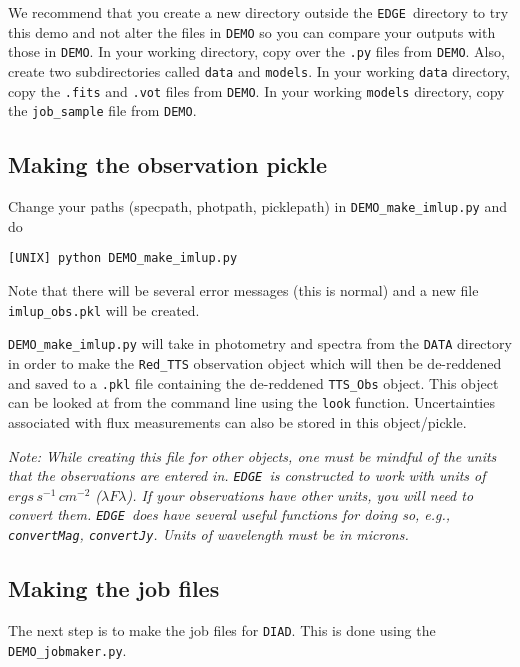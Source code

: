 \documentclass{article}
\newcommand{\edge}{\texttt{EDGE }}
\begin{document}
We recommend that you create a new directory outside the \edge directory to try this demo and not alter the files in \texttt{DEMO} so you can compare your outputs with those in \texttt{DEMO}.  In your working directory, copy over the \texttt{.py} files from \texttt{DEMO}. Also, create two subdirectories called \texttt{data} and \texttt{models}.  In your working \texttt{data} directory, copy the \texttt{.fits} and \texttt{.vot} files from \texttt{DEMO}.  In your working \texttt{models} directory, copy the \texttt{job\_sample} file from \texttt{DEMO}.

\subsection{Making the observation pickle}

Change your paths (specpath, photpath, picklepath) in \texttt{DEMO\_make\_imlup.py} and do

\vspace{2mm}
\texttt{[UNIX] python DEMO\_make\_imlup.py}
\vspace{2mm}

Note that there will be several error messages (this is normal) and a new file \texttt{imlup\_obs.pkl} will be created.

\texttt{DEMO\_make\_imlup.py} will take in photometry and spectra from the \texttt{DATA} directory in order to make the \texttt{Red\_TTS} observation object which will then be de-reddened and saved to a \texttt{.pkl} file containing the de-reddened \texttt{TTS\_Obs} object. This object can be looked at from the command line using the \texttt{look} function. Uncertainties associated with flux measurements can also be stored in this object/pickle.

\textit{Note: While creating this file for other objects, one must be mindful of the units that the observations are entered in. \edge is constructed to work with units of $ergs\,s^{-1}\,cm^{-2}$ ($\lambda F \lambda$). If your observations have other units, you will need to convert them. \edge does have several useful functions for doing so, e.g., \texttt{convertMag}, \texttt{convertJy}. Units of wavelength must be in microns.}

\subsection{Making the job files}

The next step is to make the job files for \texttt{DIAD}. This is done using the \texttt{DEMO\_jobmaker.py}. 
\end{document}
